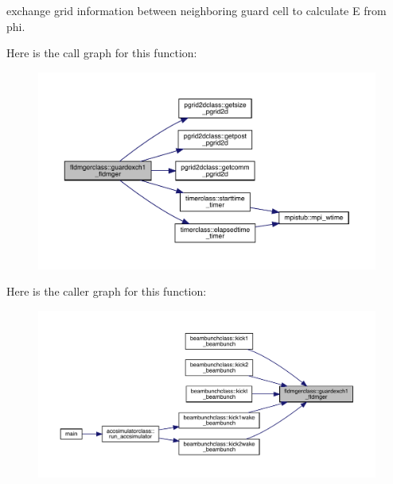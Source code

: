 exchange grid information between neighboring guard cell to calculate E from phi. 

Here is the call graph for this function\+:\nopagebreak
\begin{figure}[H]
\begin{center}
\leavevmode
\includegraphics[width=350pt]{namespacefldmgerclass_a028236bf0d8419b6f75a7fb28eb7226b_cgraph}
\end{center}
\end{figure}
Here is the caller graph for this function\+:\nopagebreak
\begin{figure}[H]
\begin{center}
\leavevmode
\includegraphics[width=350pt]{namespacefldmgerclass_a028236bf0d8419b6f75a7fb28eb7226b_icgraph}
\end{center}
\end{figure}
\mbox{\label{namespacefldmgerclass_a54886b0763b8458a0560ccf7087b07f1}} 
